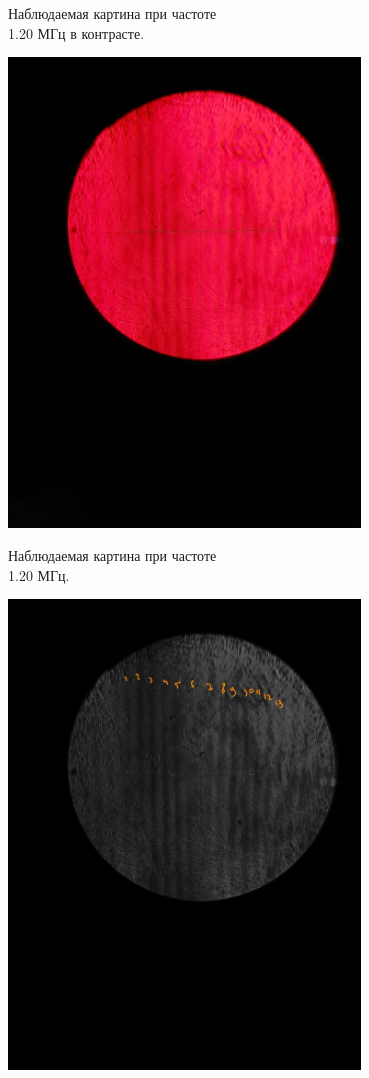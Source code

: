 \documentclass{article}
\begin{document}
\begin{enumerate}
\begin{minipage}{0.47\textwidth}
\begin{center}
	Наблюдаемая картина при частоте\\ 1.20 МГц в контрасте.
\end{center}
\end{minipage}

\newline


\begin{minipage}{0.47\textwidth}
\begin{center}
\includegraphics[width=0.7\textwidth]{red 2.jpg}
	
	Наблюдаемая картина при частоте\\ 1.20 МГц.
\end{center}
\end{minipage}
\begin{minipage}{0.47\textwidth}
\begin{center}
\includegraphics[width=0.7\textwidth]{grey 2.jpg}
	

\end{center}
\end{minipage}
\end{enumerate}
\end{document}
